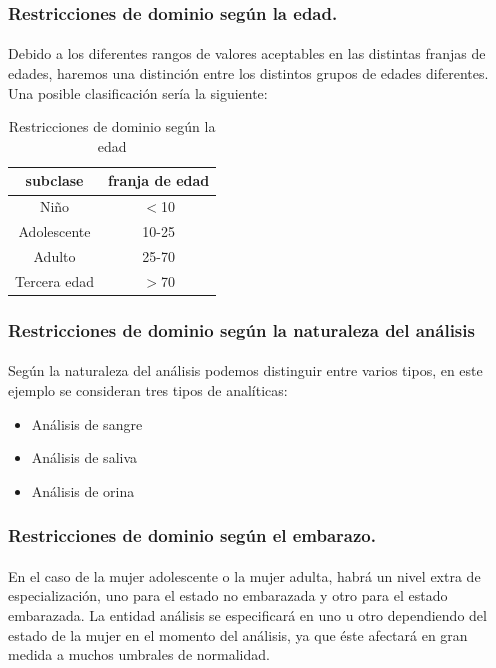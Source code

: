 \documentclass[a4paper,10pt]{article}
\begin{document}
\subsubsection{Restricciones de dominio según la edad.}
\paragraph{}
Debido a los diferentes rangos de valores aceptables en las distintas franjas de edades, haremos una distinción entre los distintos grupos de edades diferentes. Una posible clasificación sería la siguiente:
\begin{table}[hbt]
		\begin{center}
		\begin{tabular}{|c|c|}\hline
			subclase & franja de edad \\ \hline
			Niño & $<$10 \\ \hline
			Adolescente & 10-25 \\ \hline
			Adulto & 25-70 \\ \hline
			Tercera edad & $>$70 \\ \hline
		\end{tabular}
		\caption{Restricciones de dominio según la edad}
	\end{center}
\end{table}
\subsubsection{Restricciones de dominio según la naturaleza del análisis}
\paragraph{}
Según la naturaleza del análisis podemos distinguir entre varios tipos, en este ejemplo se consideran tres tipos de analíticas:
\begin{itemize}
	\item Análisis de sangre
	\item Análisis de saliva
	\item Análisis de orina
\end{itemize}
\subsubsection{Restricciones de dominio según el embarazo.}
\paragraph{}
En el caso de la mujer adolescente o la mujer adulta, habrá un nivel extra de especialización, uno para el estado no embarazada y otro para el estado embarazada. La entidad análisis se especificará en uno u otro dependiendo del estado de la mujer en el momento del análisis, ya que éste afectará en gran medida a muchos umbrales de normalidad.
\pagebreak
\end{document}
